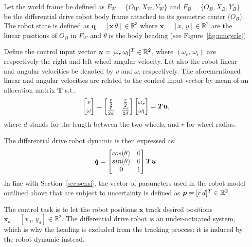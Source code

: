 Let the world frame be defined as $F_W \allowbreak = \allowbreak \{O_W, \allowbreak X_W, \allowbreak Y_W\}$ and $F_B = \allowbreak\{O_B, \allowbreak X_B, \allowbreak Y_B\}$ be the differential drive robot body frame attached to its geometric center ($O_B$).
The robot state is defined as $\boldsymbol{q} = [\boldsymbol{x} \, \theta] \in \mathbb{R}^3$ where $\boldsymbol{x} = [x, \, y] \in \mathbb{R}^2$ are the linear positions of $O_B$ in $F_W$ and $\theta$ is the body heading (see Figure~\ref{fig:unicycle}).

Define the control input vector $\boldsymbol{u} = [\omega_r \, \omega_l]^T \in \mathbb{R}^2$, where $(\omega_r, \, \omega_l)$ are respectively the right and left wheel angular velocity.
Let also the robot linear and angular velocities be denoted by $v$ and $\omega$, respectively.
The aforementioned linear and angular velocities are related to the control input vector by mean of an allocation matrix $\boldsymbol{T}$ s.t.:
\begin{equation}\label{eq:unic_alloc}
  \begin{bmatrix}
    v \\
    \omega
  \end{bmatrix}
  =
  \begin{bmatrix}
    \frac{r}{2} & \frac{r}{2}\\
    \frac{r}{2d} & \frac{-r}{2d}
  \end{bmatrix}
  \begin{bmatrix}
    \omega_r \\
    \omega_l
  \end{bmatrix}
  =
  \boldsymbol{T} \boldsymbol{u},
\end{equation}
where $d$ stands for the length between the two wheels, and $r$ for wheel radius.

The differential drive robot dynamic is then expressed as:
\begin{equation}\label{eq:unic_dyna}
  \Dot{\boldsymbol{q}} = 
  \begin{bmatrix}
    cos(\theta) & 0 \\
    sin(\theta) & 0 \\
    0 & 1
  \end{bmatrix} \boldsymbol{T} \boldsymbol{u}.
\end{equation}
In line with Section~\ref{sec:sensi}, the vector of parameters used in the robot model outlined above that are subject to uncertainty is defined as $\boldsymbol{p} = [r \, d]^T \in \mathbb{R}^{2}$.

The control task is to let the robot positions $\boldsymbol{x}$ track desired positions $\boldsymbol{x}_d = [x_d, \, y_d] \in \mathbb{R}^2$.
The differential drive robot is an under-actuated system, which is why the heading is excluded from the tracking process; it is induced by the robot dynamic instead.

